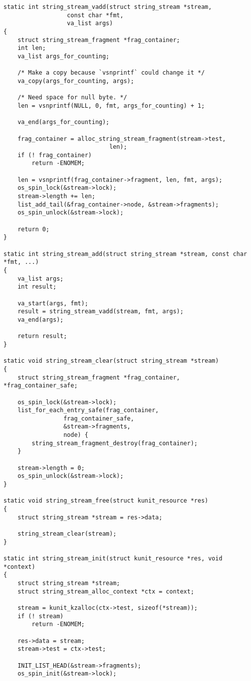 \documentclass{article}
\begin{document}
\begin{lstlisting}[style=CStyle]
static int string_stream_vadd(struct string_stream *stream,
			      const char *fmt,
			      va_list args)
{
	struct string_stream_fragment *frag_container;
	int len;
	va_list args_for_counting;

	/* Make a copy because `vsnprintf` could change it */
	va_copy(args_for_counting, args);

	/* Need space for null byte. */
	len = vsnprintf(NULL, 0, fmt, args_for_counting) + 1;

	va_end(args_for_counting);

	frag_container = alloc_string_stream_fragment(stream->test,
						      len);
	if (! frag_container)
		return -ENOMEM;

	len = vsnprintf(frag_container->fragment, len, fmt, args);
	os_spin_lock(&stream->lock);
	stream->length += len;
	list_add_tail(&frag_container->node, &stream->fragments);
	os_spin_unlock(&stream->lock);

	return 0;
}

static int string_stream_add(struct string_stream *stream, const char *fmt, ...)
{
	va_list args;
	int result;

	va_start(args, fmt);
	result = string_stream_vadd(stream, fmt, args);
	va_end(args);

	return result;
}

static void string_stream_clear(struct string_stream *stream)
{
	struct string_stream_fragment *frag_container, *frag_container_safe;

	os_spin_lock(&stream->lock);
	list_for_each_entry_safe(frag_container,
				 frag_container_safe,
				 &stream->fragments,
				 node) {
		string_stream_fragment_destroy(frag_container);
	}

	stream->length = 0;
	os_spin_unlock(&stream->lock);
}

static void string_stream_free(struct kunit_resource *res)
{
	struct string_stream *stream = res->data;

	string_stream_clear(stream);
}

static int string_stream_init(struct kunit_resource *res, void *context)
{
	struct string_stream *stream;
	struct string_stream_alloc_context *ctx = context;

	stream = kunit_kzalloc(ctx->test, sizeof(*stream));
	if (! stream)
		return -ENOMEM;

	res->data = stream;
	stream->test = ctx->test;

	INIT_LIST_HEAD(&stream->fragments);
	os_spin_init(&stream->lock);


\end{lstlisting}
\end{document}

